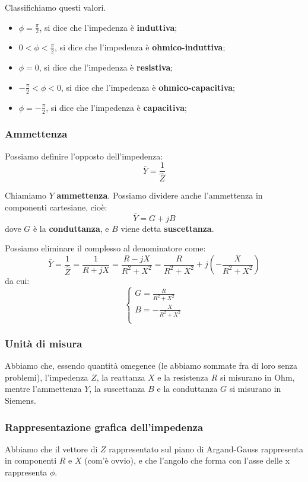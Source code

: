 \documentclass[a4paper,11pt]{article}
\begin{document}
Classifichiamo questi valori.
\begin{itemize}
	\item $\phi = \frac{\pi}{2}$, si dice che l'impedenza è \textbf{induttiva};
	\item $0 < \phi < \frac{\pi}{2}$, si dice che l'impedenza è \textbf{ohmico-induttiva};
	\item $\phi = 0$, si dice che l'impedenza è \textbf{resistiva};
	\item $-\frac{\pi}{2} < \phi < 0$, si dice che l'impedenza è \textbf{ohmico-capacitiva}; 
	\item $\phi = -\frac{\pi}{2}$, si dice che l'impedenza è \textbf{capacitiva};
\end{itemize}

\subsubsection{Ammettenza}
Possiamo definire l'opposto dell'impedenza:
$$
\bar{Y} = \frac{1}{\hat{Z}}
$$

Chiamiamo $Y$ \textbf{ammettenza}.
Possiamo dividere anche l'ammettenza in componenti cartesiane, cioè:
$$
\bar{Y} = G + j B
$$
dove $G$ è la \textbf{conduttanza}, e $B$ viene detta \textbf{suscettanza}.

Possiamo eliminare il complesso al denominatore come:
$$
\bar{Y} = \frac{1}{\hat{Z}} = \frac{1}{R + jX} = \frac{R - jX}{R^2 + X^2} = \frac{R}{R^2 + X^2} + j \left(-\frac{X}{R^2 + X^2}\right)
$$
da cui:
\[
	\begin{cases}
		G = \frac{R}{R^2 + X^2} \\ 	
		B = -\frac{X}{R^2 + X^2} \\ 	
	\end{cases}
\]

\subsubsection{Unità di misura}
Abbiamo che, essendo quantità omegenee (le abbiamo sommate fra di loro senza problemi), l'impedenza $Z$, la reattanza $X$ e la resistenza $R$ si misurano in Ohm, mentre l'ammettenza $Y$, la suscettanza $B$ e la conduttanza $G$ si misurano in Siemens.

\subsubsection{Rappresentazione grafica dell'impedenza}
Abbiamo che il vettore di $Z$ rappresentato sul piano di Argand-Gauss rappresenta in componenti $R$ e $X$ (com'è ovvio), e che l'angolo che forma con l'asse delle x rappresenta $\phi$.
\end{document}
